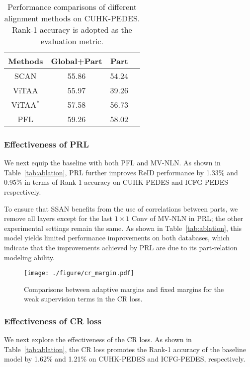 \documentclass[journal]{IEEEtran}
\begin{document}
\newcommand{\tabincell}[2]{\begin{tabular}{@{}#1@{}}#2\end{tabular}}
\newcommand{\thickhline}{
    \noalign {\ifnum 0=`}\fi \hrule height 1pt
    \futurelet \reserved@a \@xhline}

\begin{table}
\centering
\caption{Performance comparisons of different alignment methods on CUHK-PEDES. Rank-1 accuracy is adopted as the evaluation metric.}
\begin{tabular}{c|ccc}
    \hline
    Methods & Global+Part  & Part \\
    \hline
    \hline
    SCAN \cite{lee2018stacked}  & 55.86 & 54.24 \\
    ViTAA \cite{wang2020vitaa} & 55.97 & 39.26 \\
ViTAA$^{*}$ & 57.58 & 56.73 \\
    PFL         & 59.26 & 58.02 \\
    \hline
\end{tabular}
\label{tab:pfl}
\end{table}




\subsubsection{Effectiveness of PRL} We next equip the baseline with both PFL and MV-NLN. As shown in Table~\ref{tab:ablation}, PRL further improves ReID performance by 1.33\% and 0.95\% in terms of Rank-1 accuracy on CUHK-PEDES and ICFG-PEDES respectively.


To ensure that SSAN benefits from the use of correlations between parts, we remove all layers except for the last $1 \times 1$ Conv of MV-NLN in PRL; the other experimental settings remain the same. As shown in Table~\ref{tab:ablation}, this model yields limited performance improvements on both databases, which indicate that the improvements achieved by PRL are due to its part-relation modeling ability.

\begin{figure}[t]
\begin{center}
\texttt{[image: ./figure/cr\_margin.pdf]}
\end{center}
   \caption{Comparisons between adaptive margins and fixed margins for the weak supervision terms in the CR loss.}
\label{fig:cr_margin}
\end{figure}

\subsubsection{Effectiveness of CR loss} We next explore the effectiveness of the CR loss. As shown in Table~\ref{tab:ablation}, the CR loss promotes the Rank-1 accuracy of the baseline model by 1.62\% and 1.21\% on CUHK-PEDES and ICFG-PEDES, respectively.
\end{document}
